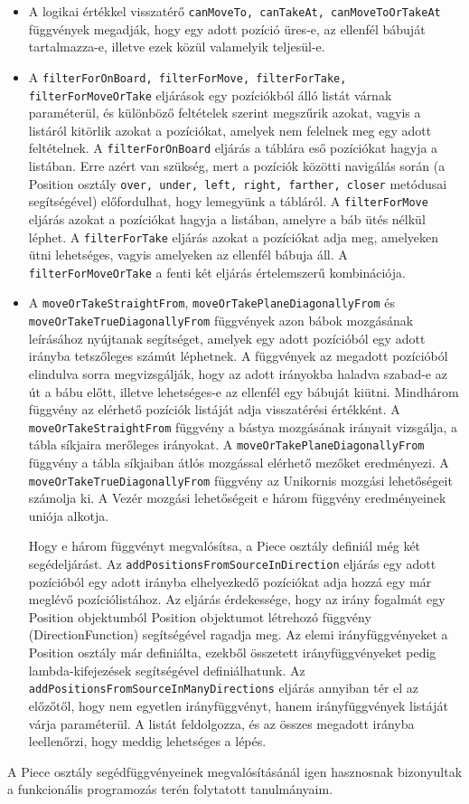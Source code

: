 \documentclass[12pt, twoside]{report}
\begin{document}
\begin{itemize}
	\item A logikai értékkel visszatérő {\tt canMoveTo, canTakeAt, canMoveToOrTakeAt} függvények megadják, hogy egy adott pozíció üres-e, az ellenfél bábuját tartalmazza-e, illetve ezek közül valamelyik teljesül-e.
	\item A {\tt filterForOnBoard, filterForMove, filterForTake, filterForMoveOrTake} eljárások egy pozíciókból álló listát várnak paraméterül, és különböző feltételek szerint megszűrik azokat, vagyis a listáról kitörlik azokat a pozíciókat, amelyek nem felelnek meg egy adott feltételnek. 
		\subitem A {\tt filterForOnBoard} eljárás a táblára eső pozíciókat hagyja a listában. Erre azért van szükség, mert a pozíciók közötti navigálás során (a Position osztály {\tt over, under, left, right, farther, closer} metódusai segítségével) előfordulhat, hogy lemegyünk a tábláról. 
		\subitem A {\tt filterForMove} eljárás azokat a pozíciókat hagyja a listában, amelyre a báb ütés nélkül léphet.
		\subitem A {\tt filterForTake} eljárás azokat a pozíciókat adja meg, amelyeken ütni lehetséges, vagyis amelyeken az ellenfél bábuja áll.
		\subitem A {\tt filterForMoveOrTake} a fenti két eljárás értelemszerű kombinációja.
	\item A {\tt moveOrTakeStraightFrom}, {\tt moveOrTakePlaneDiagonallyFrom} és {\tt moveOrTakeTrueDiagonallyFrom} függvények azon bábok mozgásának leírásához nyújtanak segítséget, amelyek egy adott pozícióból egy adott irányba tetszőleges számút léphetnek. A függvények az megadott pozícióból elindulva sorra megvizsgálják, hogy az adott irányokba haladva szabad-e az út a bábu előtt, illetve lehetséges-e az ellenfél egy bábuját kiütni. Mindhárom függvény az elérhető pozíciók listáját adja visszatérési értékként. A {\tt moveOrTakeStraightFrom} függvény a bástya mozgásának irányait vizsgálja, a tábla síkjaira merőleges irányokat. A {\tt moveOrTakePlaneDiagonallyFrom} függvény a tábla síkjaiban átlós mozgással elérhető mezőket eredményezi. A {\tt moveOrTakeTrueDiagonallyFrom} függvény az Unikornis mozgási lehetőségeit számolja ki. A Vezér mozgási lehetőségeit e három függvény eredményeinek uniója alkotja.
	
	Hogy e három függvényt megvalósítsa, a Piece osztály definiál még két segédeljárást.
	\subitem Az {\tt addPositionsFromSourceInDirection} eljárás egy adott pozícióból egy adott irányba elhelyezkedő pozíciókat adja hozzá egy már meglévő pozíciólistához. Az eljárás érdekessége, hogy az irány fogalmát egy Position objektumból Position objektumot létrehozó függvény (DirectionFunction) segítségével ragadja meg. Az elemi irányfüggvényeket a Position osztály már definiálta, ezekből összetett irányfüggvényeket pedig lambda-kifejezések segítségével definiálhatunk.
	\subitem Az {\tt addPositionsFromSourceInManyDirections} eljárás annyiban tér el az előzőtől, hogy nem egyetlen irányfüggvényt, hanem irányfüggvények listáját várja paraméterül. A listát feldolgozza, és az összes megadott irányba leellenőrzi, hogy meddig lehetséges a lépés.
\end{itemize}
A Piece osztály segédfüggvényeinek megvalósításánál igen hasznosnak bizonyultak a funkcionális programozás terén folytatott tanulmányaim.
\end{document}
